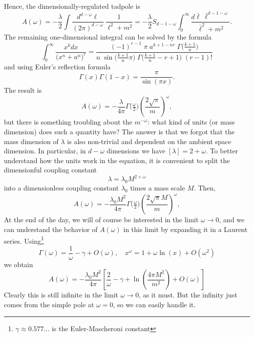 \documentclass[12pt]{article}
\begin{document}
Hence, the dimensionally-regulated tadpole is 
\begin{equation}
  A(\omega) = -\frac{\lambda}{2}
  \int
  \frac{d^{d-\omega}\ell}{(2\pi)^{d-\omega}} ~
  \frac{1}{\ell^2 + m^2}
  = -\frac{\lambda}{2}
  S_{d-1-\omega}
  \int_0^\infty \frac{d\bar\ell ~ \bar\ell^{d-1-\omega}}{\bar\ell^2 + m^2}.
\end{equation}
The remaining one-dimensional integral can be solved by the formula
\begin{equation}
  \int_0^\infty 
  \frac{x^k dx}{\big(x^n + a^n\big)^r} 
  =
  \frac{
    (-1)^{r-1}\; \pi \; a^{k+1-nr} \; \Gamma\big(\tfrac{k+1}{n}\big)
  }{
    n \; \sin\big(\tfrac{k+1}{n} \pi\big) 
    \; \Gamma\big(\tfrac{k+1}{n}-r+1\big) 
    \; (r-1)!
  }
\end{equation}
and using Euler's reflection formula
\begin{equation}
  \Gamma(x) \Gamma(1-x) = \frac{\pi}{\sin(\pi x)}.
\end{equation}
The result is 
\begin{equation}
  A(\omega) = -\frac{\lambda}{4\pi} 
  \Gamma\big(\tfrac{\omega}{2}\big)
  \left(\frac{2 \sqrt{\pi}}{m} \right)^\omega,
\end{equation}
but there is something troubling about the $m^{-\omega}$: what kind of
units (or mass dimension) does such a quantity have? The answer is
that we forgot that the mass dimension of $\lambda$ is also
non-trivial and dependent on the ambient space dimension. In
particular, in $d-\omega$ dimensions we have $[\lambda] =
2+\omega$. To better understand how the units work in the equation, it
is convenient to split the dimensionful coupling constant
\begin{equation}
  \lambda = \lambda_0 M^{2+\omega}
\end{equation}
into a dimensionless coupling constant $\lambda_0$ times a mass scale
$M$. Then,
\begin{equation}
  A(\omega) = -\frac{\lambda_0 M^2}{4\pi} 
  \Gamma\big(\tfrac{\omega}{2}\big)
  \left(\frac{2 \sqrt{\pi}M}{m} \right)^\omega,
\end{equation}
At the end of the day, we will of course be interested in the limit
$\omega\to 0$, and we can understand the behavior of $A(\omega)$ in
this limit by expanding it in a Laurent
series. Using\footnote{$\gamma\approx 0.577\dots$ is the
  Euler-Mascheroni constant}
\begin{equation}
  \Gamma(\omega) = \frac{1}{\omega} - \gamma + O(\omega)
  ,\quad
  x^\omega = 1 + \omega \ln(x) + O(\omega^2)
\end{equation}
we obtain
\begin{equation}
  A(\omega) = -\frac{\lambda_0 M^2}{4\pi}
  \left[
    \frac{2}{\omega}
    - \gamma
    + \ln\left(
      \frac{4\pi M^2}{m^2}
    \right)
    + O(\omega)
  \right]
\end{equation}
Clearly this is still infinite in the limit $\omega\to 0$, as it
must. But the infinity just comes from the simple pole at $\omega=0$,
so we can easily handle it.
\end{document}
